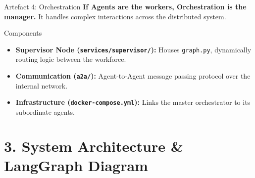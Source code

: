 \documentclass[aspectratio=169, xcolor=table]{beamer}
\begin{document}
\begin{frame}{Artefact 4: Orchestration}
    \textbf{If Agents are the workers, Orchestration is the manager.} It handles complex interactions across the distributed system.
    
    \vspace{0.3cm}
    \begin{block}{Components}
        \begin{itemize}
            \item \textbf{Supervisor Node (\texttt{services/supervisor/}):} Houses \texttt{graph.py}, dynamically routing logic between the workforce.
            \item \textbf{Communication (\texttt{a2a/}):} Agent-to-Agent message passing protocol over the internal network.
            \item \textbf{Infrastructure (\texttt{docker-compose.yml}):} Links the master orchestrator to its subordinate agents.
        \end{itemize}
    \end{block}
\end{frame}

\section{3. System Architecture \& LangGraph Diagram}
\end{document}
